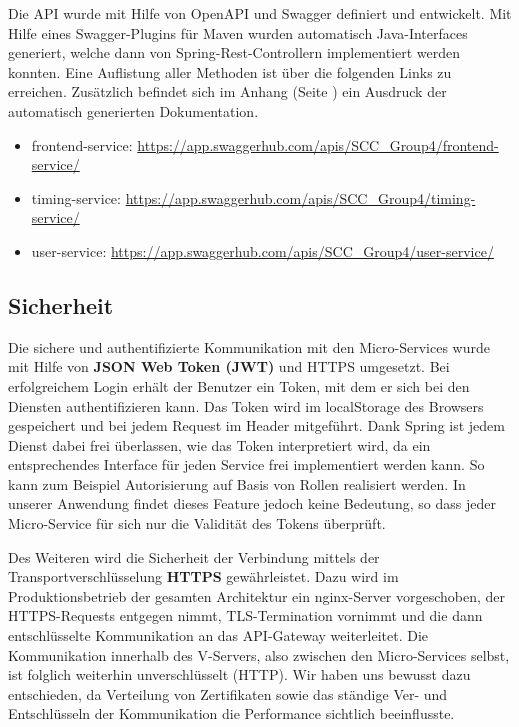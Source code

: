Die API wurde mit Hilfe von OpenAPI und Swagger definiert und entwickelt. Mit Hilfe eines Swagger-Plugins für Maven wurden automatisch Java-Interfaces generiert, welche dann von Spring-Rest-Controllern implementiert werden konnten. Eine Auflistung aller Methoden ist über die folgenden Links zu erreichen. Zusätzlich befindet sich im Anhang (Seite \pageref{Anhang}) ein Ausdruck der automatisch generierten Dokumentation.

\begin{itemize}
	\item frontend-service: \newline  \url{https://app.swaggerhub.com/apis/SCC_Group4/frontend-service/}
	\item timing-service: \newline \url{https://app.swaggerhub.com/apis/SCC_Group4/timing-service/}
	\item user-service: \newline \url{https://app.swaggerhub.com/apis/SCC_Group4/user-service/}
\end{itemize}

\subsection{Sicherheit}

Die sichere und authentifizierte Kommunikation mit den Micro-Services wurde mit Hilfe von \textbf{JSON Web Token (JWT)} und HTTPS umgesetzt. Bei erfolgreichem Login erhält der Benutzer ein Token, mit dem er sich bei den Diensten authentifizieren kann.  Das Token wird im localStorage des Browsers gespeichert und bei jedem Request im Header mitgeführt. Dank Spring ist jedem Dienst dabei frei überlassen, wie das Token interpretiert wird, da ein entsprechendes Interface für jeden Service frei implementiert werden kann. So kann zum Beispiel Autorisierung auf Basis von Rollen realisiert werden. In unserer Anwendung findet dieses Feature jedoch keine Bedeutung, so dass jeder Micro-Service für sich nur die Validität des Tokens überprüft.

Des Weiteren wird die Sicherheit der Verbindung mittels der Transportverschlüsselung \textbf{HTTPS} gewährleistet.  Dazu wird im Produktionsbetrieb der gesamten Architektur ein nginx-Server vorgeschoben, der HTTPS-Requests entgegen nimmt, TLS-Termination vornimmt und die dann entschlüsselte Kommunikation an das API-Gateway weiterleitet. Die Kommunikation innerhalb des V-Servers, also zwischen den Micro-Services selbst, ist folglich weiterhin unverschlüsselt (HTTP). Wir haben uns bewusst dazu entschieden, da Verteilung von Zertifikaten sowie das ständige Ver- und Entschlüsseln der Kommunikation die Performance sichtlich beeinflusste.
